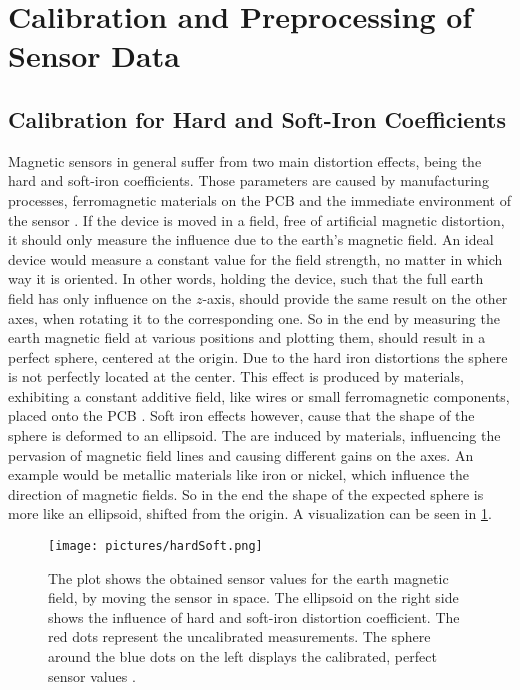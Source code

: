 \FloatBarrier

\section{Calibration and Preprocessing of Sensor Data} \label{sec:caliPrepro}

\subsection{Calibration for Hard and Soft-Iron Coefficients} \label{subsec:hardSoft}

Magnetic sensors in general suffer from two main distortion effects, being the hard and soft-iron coefficients. Those parameters are caused by manufacturing processes, ferromagnetic materials on the \ac{PCB} and the immediate environment of the sensor \cite{ozyagcilar2012calibrating}. If the device is moved in a field, free of artificial magnetic distortion, it should only measure the influence due to the earth's magnetic field. An ideal device would measure a constant value for the field strength, no matter in which way it is oriented. In other words, holding the device, such that the full earth field has only influence on the $ z $-axis, should provide the same result on the other axes, when rotating it to the corresponding one. So in the end by measuring the earth magnetic field at various positions and plotting them, should result in a perfect sphere, centered at the origin. Due to the hard iron distortions the sphere is not perfectly located at the center. This effect is produced by materials, exhibiting a constant additive field, like wires or small ferromagnetic components, placed onto the \ac{PCB} \cite{konv2009}. Soft iron effects however, cause that the shape of the sphere is deformed to an ellipsoid. The are induced by materials, influencing the pervasion of magnetic field lines and causing different gains on the axes. An example would be metallic materials like iron or nickel, which influence the direction of magnetic fields. So in the end the shape of the expected sphere is more like an ellipsoid, shifted from the origin. A visualization can be seen in \ref{fig:hardSoft}.
\begin{figure}
\centering
\texttt{[image: pictures/hardSoft.png]}
\caption[Calibrated and uncalibrated sensor data]
{The plot shows the obtained sensor values for the earth magnetic field, by moving the sensor in space. The ellipsoid on the right side shows the influence of hard and soft-iron distortion coefficient. The red dots represent the uncalibrated measurements. The sphere around the blue dots on the left displays the calibrated, perfect sensor values \cite{ozyagcilar2012calibrating}.}
\label{fig:hardSoft}
\end{figure}
